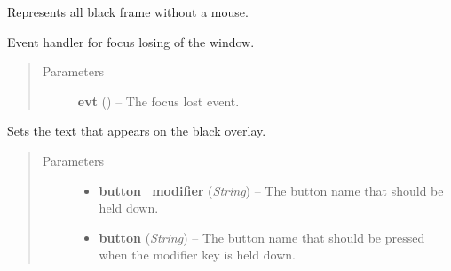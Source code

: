\documentclass[letterpaper,10pt,english]{sphinxmanual}
\begin{document}
\begin{fulllineitems}
\label{graphicaldesign:graphicaldesign.BlackOverlay}
Represents all black frame without a mouse.

\begin{fulllineitems}
\label{graphicaldesign:graphicaldesign.BlackOverlay.OnFocusLost}
Event handler for focus losing of the window.
\begin{quote}\begin{description}
\item[{Parameters}] \leavevmode
\textbf{evt} () -- The focus lost event.

\end{description}\end{quote}

\end{fulllineitems}


\begin{fulllineitems}
\label{graphicaldesign:graphicaldesign.BlackOverlay.SetText}
Sets the text that appears on the black overlay.
\begin{quote}\begin{description}
\item[{Parameters}] \leavevmode\begin{itemize}
\item {} 
\textbf{button\_modifier} (\emph{String}) -- The button name that should be held down.

\item {} 
\textbf{button} (\emph{String}) -- The button name that should be pressed when the modifier
key is held down.

\end{itemize}

\end{description}\end{quote}

\end{fulllineitems}


\end{fulllineitems}
\end{document}
